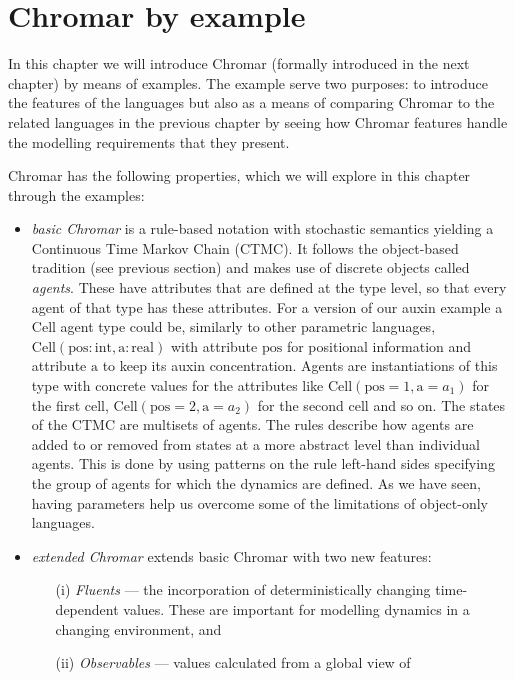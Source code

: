 \documentclass[phd]{infthesis}
\newcommand{\mr}[1]{\mathrm{#1}}
\begin{document}
\chapter{Chromar by example}
\label{chp:chromarEx}
In this chapter we will introduce Chromar (formally introduced in the next
chapter) by means of examples. The example serve two purposes: to introduce the
features of the languages but also as a means of comparing Chromar to the related
languages in the previous chapter by seeing how Chromar features handle the
modelling requirements that they present.

Chromar has the following properties, which we will explore in this chapter
through the examples:
\begin{itemize}
\item \emph{basic Chromar} is a rule-based notation with stochastic semantics
  yielding a Continuous Time Markov Chain (CTMC). It follows the object-based
  tradition (see previous section) and makes use of discrete objects called
  \emph{agents}. These have attributes that are defined at the type level, so
  that every agent of that type has these attributes. For a version of our auxin
  example a $\mr{Cell}$ agent type could be, similarly to other parametric
  languages,
  $\mathrm{Cell}(\mathrm{pos}:\mathrm{int}, \mathrm{a}: \mathrm{real})$ with
  attribute $\mathrm{pos}$ for positional information and attribute $\mathrm{a}$
  to keep its auxin concentration. Agents are instantiations of this type with
  concrete values for the attributes like
  $\mathrm{Cell}(\mathrm{pos}=1, \mathrm{a}=a_1)$ for the first cell,
  $\mathrm{Cell}(\mathrm{pos}=2, \mathrm{a}=a_2)$ for the second cell and so
  on. The states of the CTMC are multisets of agents. The rules describe how
  agents are added to or removed from states at a more abstract level than
  individual agents. This is done by using patterns on the rule left-hand sides
  specifying the group of agents for which the dynamics are defined. As we have
  seen, having parameters help us overcome some of the limitations of object-only
  languages.
\item \emph{extended Chromar} extends basic Chromar with two new features:
  \begin{itemize}
  \item[(i)] \textit{Fluents} --- the incorporation of deterministically
    changing time-dependent values. These are important for modelling dynamics
    in a changing environment, and
  \item[(ii)] \textit{Observables} --- values calculated from a global view of

\end{itemize}
\end{itemize}
\end{document}
